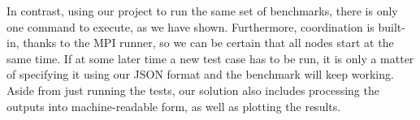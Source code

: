 In contrast, using our project to run the same set of benchmarks, there is only one command to execute, as we have shown. Furthermore, coordination is built-in, thanks to the MPI runner, so we can be certain that all nodes start at the same time. If at some later time a new test case has to be run, it is only a matter of specifying it using our JSON format and the benchmark will keep working. Aside from just running the tests, our solution also includes processing the outputs into machine-readable form, as well as plotting the results.
